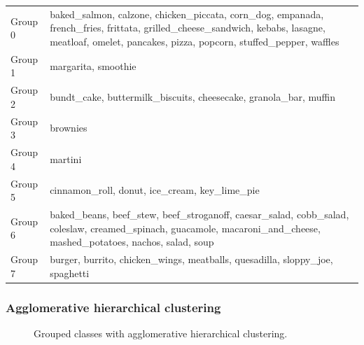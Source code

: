 \documentclass[10pt]{article}
\newcommand\inputpgf[2]{{
\let\pgfimageWithoutPath\pgfimage
\renewcommand{\pgfimage}[2][]{\pgfimageWithoutPath[##1]{#1/##2}}

}}
\begin{document}
					\renewcommand\theadfont{\bfseries}
					\begin{table}[htb]
						\small
						\centering
						{\def\arraystretch{2}\tabcolsep=5pt
							\begin{tabularx}{\linewidth}{ l | X }
								\hline
								\thead[l]{Group} & \thead[l]{Classes} \\
								\hline
								Group 0 & baked\_salmon, calzone, chicken\_piccata, corn\_dog, empanada, french\_fries, frittata, grilled\_cheese\_sandwich, kebabs, lasagne, meatloaf, omelet, pancakes, pizza, popcorn, stuffed\_pepper, waffles \\
								Group 1 & margarita, smoothie \\
								Group 2 & bundt\_cake, buttermilk\_biscuits, cheesecake, granola\_bar, muffin \\
								Group 3 & brownies \\
								Group 4 & martini \\
								Group 5 & cinnamon\_roll, donut, ice\_cream, key\_lime\_pie \\
								Group 6 & baked\_beans, beef\_stew, beef\_stroganoff, caesar\_salad, cobb\_salad, coleslaw, creamed\_spinach, guacamole, macaroni\_and\_cheese, mashed\_potatoes, nachos, salad, soup \\
								Group 7 & burger, burrito, chicken\_wings, meatballs, quesadilla, sloppy\_joe, spaghetti
							\end{tabularx}
						}
						\label{tbl:table_grouped_classes}
					\end{table}
				
				\subsubsection{Agglomerative hierarchical clustering}
				
					\begin{figure}[H]
						\begin{center}
							\scalebox{0.5}{
								\inputpgf{images/pgf}{pca-grouped-ahc.pgf}
							}
						\end{center}
						\caption{Grouped classes with agglomerative hierarchical clustering.}
						\label{fig:analysis_grouped_classes_with_ahc}
					\end{figure}
					
\end{document}
